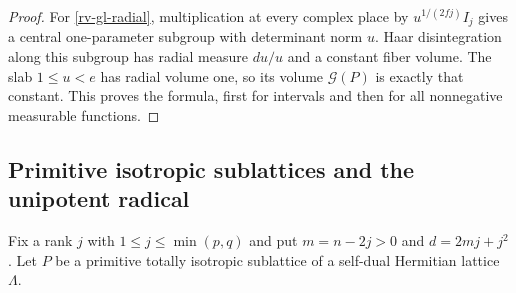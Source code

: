 \begin{proof}
For \eqref{rv-gl-radial}, multiplication at every complex
place by $u^{1/(2fj)}I_j$ gives a central one-parameter
subgroup with determinant norm $u$.  Haar disintegration
along this subgroup has radial measure $du/u$ and a
constant fiber volume.  The slab $1\le u<e$ has radial
volume one, so its volume $\mathcal G(P)$ is exactly that
constant.  This proves the formula, first for intervals
and then for all nonnegative measurable functions.
\end{proof}

\subsection{Primitive isotropic sublattices and the unipotent radical}

Fix a rank $j$ with $1\le j\le\min(p,q)$ and put
$m=n-2j>0$ and $d=2mj+j^2$.
Let $P$ be a primitive totally isotropic sublattice of a
self-dual Hermitian lattice $\Lambda$.

